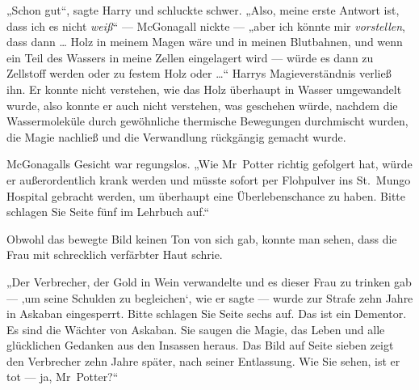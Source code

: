 „Schon gut“, sagte Harry und schluckte schwer.
„Also, meine erste Antwort ist, dass ich es nicht \emph{weiß}“ — McGonagall nickte — „aber ich könnte mir \emph{vorstellen}, dass dann … Holz in meinem Magen wäre und in meinen Blutbahnen, und wenn ein Teil des Wassers in meine Zellen eingelagert wird — würde es dann zu Zellstoff werden oder zu festem Holz oder …“ Harrys Magieverständnis verließ ihn. Er konnte nicht verstehen, wie das Holz überhaupt in Wasser umgewandelt wurde, also konnte er auch nicht verstehen, was geschehen würde, nachdem die Wassermoleküle durch gewöhnliche thermische Bewegungen durchmischt wurden, die Magie nachließ und die Verwandlung rückgängig gemacht wurde.

McGonagalls Gesicht war regungslos.
„Wie Mr~Potter richtig gefolgert hat, würde er außerordentlich krank werden und müsste sofort per Flohpulver ins St.~Mungo Hospital gebracht werden, um überhaupt eine Überlebenschance zu haben. Bitte schlagen Sie Seite fünf im Lehrbuch auf.“

Obwohl das bewegte Bild keinen Ton von sich gab, konnte man sehen, dass die Frau mit schrecklich verfärbter Haut schrie.

„Der Verbrecher, der Gold in Wein verwandelte und es dieser Frau zu trinken gab — ‚um seine Schulden zu begleichen‘, wie er sagte — wurde zur Strafe zehn Jahre in Askaban eingesperrt. Bitte schlagen Sie Seite sechs auf. Das ist ein Dementor. Es sind die Wächter von Askaban. Sie saugen die Magie, das Leben und alle glücklichen Gedanken aus den Insassen heraus. Das Bild auf Seite sieben zeigt den Verbrecher zehn Jahre später, nach seiner Entlassung. Wie Sie sehen, ist er tot — ja, Mr~Potter?“

